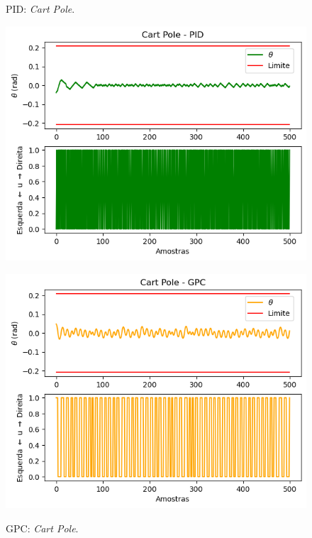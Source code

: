 \documentclass[12pt,           %
a4paper,                       %
openany,                       %
oneside,                       %
chapter=TITLE,                 %
english,                       %
spanish,                       %
brazil,                        %
sumario=tradicional]{abntex2}  %
\begin{document}
\begin{OnehalfSpace}
\begin{figure}[H]
  \begin{minipage}{0.5\textwidth}
    \centering
     \caption{PID: \textit{Cart Pole}.}
     \includegraphics[scale=0.47]{ctpidio.png}
    \label{fig:imagem1}
  \end{minipage}
  \begin{minipage}{0.5\textwidth}
    \centering
     \caption{GPC: \textit{Cart Pole}.}
     \includegraphics[scale=0.47]{ctgpcio.png}
    \label{fig:imagem2}
  \end{minipage}
\end{figure}
\vspace*{-.9cm}
{\raggedright {}}


\end{OnehalfSpace}
\end{document}
